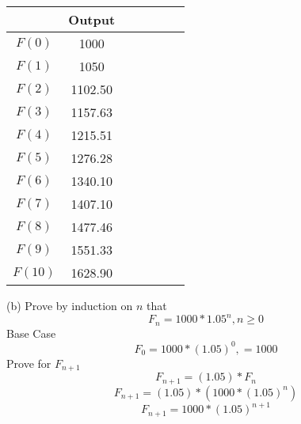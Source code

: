 \documentclass[10pt]{article}
\begin{document}
\center
\begin{tabular}{@{ }c@{ }@{ }|c c@{ }@{ }c@{ }@{ }c@{ }@{ }c@{ }@{ }c}
& Output & & & & & \\
\hline 
$F(0)$ & 1000 & & & \\
$F(1)$ & 1050 & & & \\
$F(2)$ & 1102.50 & & & \\
$F(3)$ & 1157.63 & & & \\
$F(4)$ & 1215.51 & & & \\
$F(5)$ & 1276.28 & & & \\
$F(6)$ & 1340.10 & & & \\
$F(7)$ & 1407.10 & & & \\
$F(8)$ & 1477.46 & & & \\
$F(9)$ & 1551.33 & & & \\
$F(10)$ & 1628.90 & & & \\
\end{tabular}
\flushleft

(b) Prove by induction on $n$ that
$$F_n = 1000*1.05^n, n \geq 0$$
Base Case
$$F_0 = 1000*(1.05)^0, = 1000$$
Prove for $F_{n+1}$
$$F_{n+1} = (1.05)* F_n$$
$$F_{n+1} = (1.05)* (1000 * (1.05)^n)$$
$$F_{n+1} = 1000 * (1.05)^{n+1}$$
\end{document}
